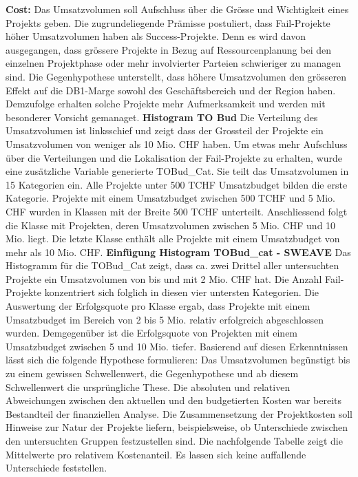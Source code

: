 \newline\newline\textbf{Cost:} Das Umsatzvolumen soll Aufschluss über die Grösse und Wichtigkeit eines Projekts geben. Die zugrundeliegende Prämisse postuliert, dass Fail-Projekte höher Umsatzvolumen haben als Success-Projekte. Denn es wird davon ausgegangen, dass grössere Projekte in Bezug auf Ressourcenplanung bei den einzelnen Projektphase oder mehr involvierter Parteien schwieriger zu managen sind. Die Gegenhypothese unterstellt, dass höhere Umsatzvolumen den grösseren Effekt auf die DB1-Marge sowohl des Geschäftsbereich und der Region haben. Demzufolge erhalten  solche Projekte mehr Aufmerksamkeit und werden mit besonderer Vorsicht gemanaget. 
\newline\textbf{Histogram TO Bud}
Die Verteilung des Umsatzvolumen ist linksschief und zeigt dass der Grossteil der Projekte ein Umsatzvolumen von weniger als 10 Mio. CHF haben. Um etwas mehr Aufschluss über die Verteilungen und die Lokalisation der Fail-Projekte zu erhalten, wurde eine zusätzliche Variable generierte TOBud\_Cat. Sie teilt das Umsatzvolumen in 15 Kategorien ein. Alle Projekte unter 500 TCHF Umsatzbudget bilden die erste Kategorie. Projekte mit einem Umsatzbudget zwischen 500 TCHF und 5 Mio. CHF wurden in Klassen mit der Breite 500 TCHF unterteilt. Anschliessend folgt die Klasse mit Projekten, deren Umsatzvolumen zwischen 5 Mio. CHF und 10 Mio. liegt. Die letzte Klasse enthält alle Projekte mit einem Umsatzbudget von mehr als 10 Mio. CHF.  
\newline\textbf{Einfügung Histogram TOBud\_cat - SWEAVE}
Das Histogramm für die TOBud\_Cat zeigt, dass ca. zwei Drittel aller untersuchten Projekte ein Umsatzvolumen von bis und mit 2 Mio. CHF hat. Die Anzahl Fail-Projekte konzentriert sich folglich in diesen vier untersten Kategorien. Die Auswertung der Erfolgsquote pro Klasse ergab, dass Projekte mit einem Umsatzbudget im Bereich von 2 bis 5 Mio. relativ erfolgreich abgeschlossen wurden. Demgegenüber ist die Erfolgsquote von Projekten mit einem Umsatzbudget zwischen 5 und 10 Mio. tiefer. Basierend auf diesen Erkenntnissen lässt sich die folgende Hypothese formulieren: Das Umsatzvolumen begünstigt bis zu einem gewissen Schwellenwert, die Gegenhypothese und ab diesem Schwellenwert die ursprüngliche These.
\newline\newline Die absoluten und relativen Abweichungen zwischen den aktuellen und den budgetierten Kosten war bereits Bestandteil der finanziellen Analyse.
\newline\newline Die Zusammensetzung der Projektkosten soll Hinweise zur Natur der Projekte liefern, beispielsweise, ob Unterschiede zwischen den untersuchten Gruppen festzustellen sind. Die nachfolgende Tabelle zeigt die Mittelwerte pro relativem Kostenanteil. Es lassen sich keine auffallende Unterschiede feststellen.
